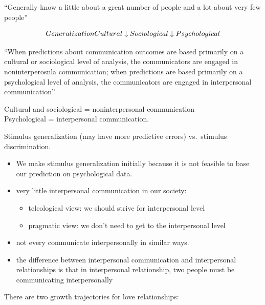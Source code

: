 \documentclass[
]{book}
\providecommand{\tightlist}{%
  \setlength{\itemsep}{0pt}\setlength{\parskip}{0pt}}
\begin{document}
``Generally know a little about a great number of people and a lot about very few people''

\[
Generalization  \\
Cultural \\
\downarrow \\
Sociological \\
\downarrow \\
Psychological 
\]

``When predictions about communication outcomes are based primarily on a cultural or sociological level of analysis, the communicators are engaged in noninterperosnla communication; when predictions are based primarily on a psychological level of analysis, the communicators are engaged in interpersonal communication''.

Cultural and sociological = noninterpersonal communication\\
Psychological = interpersonal communication.

Stimulus generalization (may have more predictive errors) vs.~stimulus discrimination.

\begin{itemize}
\item
  We make stimulus generalization initially because it is not feasible to base our prediction on psychological data.\\
\item
  very little interpersonal communication in our society:\\

  \begin{itemize}
  \tightlist
  \item
    teleological view: we should strive for interpersonal level\\
  \item
    pragmatic view: we don't need to get to the interpersonal level\\
  \end{itemize}
\item
  not every communicate interpersonally in similar ways.\\
\item
  the difference between interpersonal communication and interpersonal relationships is that in interpersonal relationship, two people must be communicating interpersonally
\end{itemize}

\citep{wilmot1995}

There are two growth trajectories for love relationships:
\end{document}
